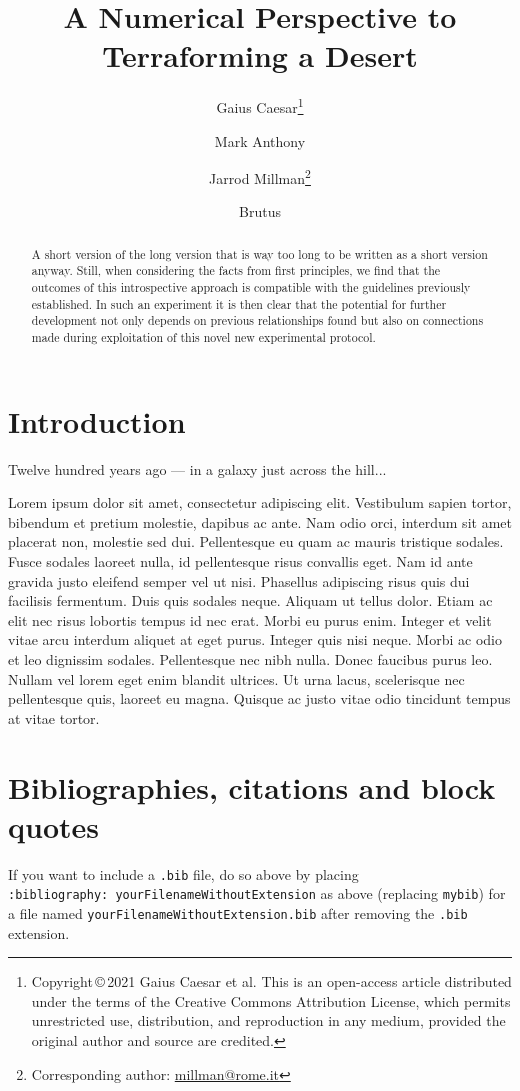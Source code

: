 \documentclass[letterpaper,compsoc,twoside,onecolumn]{IEEEtran}
\title{A Numerical Perspective to Terraforming a Desert}
\author[1,2]{Gaius
Caesar\thanks{\noindent Copyright\,\copyright\,2021 Gaius
Caesar et al. This is an open-access article distributed under the terms of the Creative Commons Attribution License, which permits unrestricted use, distribution, and reproduction in any medium, provided the original author and source are credited.}}%
\author[2]{Mark Anthony}
\author[2,3]{Jarrod
Millman\thanks{Corresponding author: \protect\href{mailto:millman@rome.it}{millman@rome.it}}}
\author[ ]{Brutus}
\affil[1]{\footnotesize Senate House, S.P.Q.R.}
\affil[2]{\footnotesize Egyptian Embassy, S.P.Q.R.}
\affil[3]{\footnotesize Yet another place, S.P.Q.R.}
\begin{document}
\maketitle

\begin{abstract}
A short version of the long version that is way too long to be written
as a short version anyway. Still, when considering the facts from first
principles, we find that the outcomes of this introspective approach is
compatible with the guidelines previously established. In such an
experiment it is then clear that the potential for further development
not only depends on previous relationships found but also on connections
made during exploitation of this novel new experimental protocol.
\end{abstract}

\hypertarget{introduction}{%
\section{Introduction}\label{introduction}}

Twelve hundred years ago --- in a galaxy just across the hill...

Lorem ipsum dolor sit amet, consectetur adipiscing elit. Vestibulum
sapien tortor, bibendum et pretium molestie, dapibus ac ante. Nam odio
orci, interdum sit amet placerat non, molestie sed dui. Pellentesque eu
quam ac mauris tristique sodales. Fusce sodales laoreet nulla, id
pellentesque risus convallis eget. Nam id ante gravida justo eleifend
semper vel ut nisi. Phasellus adipiscing risus quis dui facilisis
fermentum. Duis quis sodales neque. Aliquam ut tellus dolor. Etiam ac
elit nec risus lobortis tempus id nec erat. Morbi eu purus enim. Integer
et velit vitae arcu interdum aliquet at eget purus. Integer quis nisi
neque. Morbi ac odio et leo dignissim sodales. Pellentesque nec nibh
nulla. Donec faucibus purus leo. Nullam vel lorem eget enim blandit
ultrices. Ut urna lacus, scelerisque nec pellentesque quis, laoreet eu
magna. Quisque ac justo vitae odio tincidunt tempus at vitae tortor.

\hypertarget{bibliographies-citations-and-block-quotes}{%
\section{Bibliographies, citations and block
quotes}\label{bibliographies-citations-and-block-quotes}}

If you want to include a \texttt{.bib} file, do so above by placing
\texttt{:bibliography:\ yourFilenameWithoutExtension} as above
(replacing \texttt{mybib}) for a file named
\texttt{yourFilenameWithoutExtension.bib} after removing the
\texttt{.bib} extension.
\end{document}
